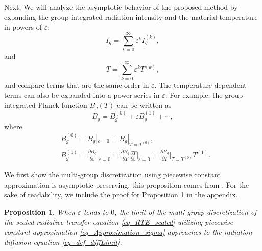 \documentclass[preprint,12pt]{elsarticle}
\theoremstyle{definition}
\theoremstyle{plain}
\newtheorem{proposition}[theorem]{Proposition}
\numberwithin{equation}{section}
\numberwithin{algorithm}{section}
\newcounter{eq_count}
\newcommand{\pdrv}[2]{\frac{\partial{#1}}{\partial{#2}}}
\begin{document}
Next, We will analyze the asymptotic behavior of the proposed method by expanding the group-integrated radiation intensity and the material temperature in powers of $\varepsilon$:
   \begin{equation*}
       I_g = \sum_{k=0}^{\infty} \varepsilon^{k} I_g^{(k)},
   \end{equation*}
   and
   \begin{equation*}
       T = \sum_{k=0}^{\infty} \varepsilon^{k} T^{(k)},
   \end{equation*}
   and compare terms that are the same order in $\varepsilon$.
   The temperature-dependent terms can also be expanded into a power series in $\varepsilon$. For example, the group integrated Planck function $B_g(T)$ can be written as
   \begin{equation*}
       B_g = B_g^{(0)} + \varepsilon B_g^{(1)} + \cdots,
   \end{equation*}
   where 
   \begin{equation*}
       \begin{aligned}
           &B_g^{(0)} = B_g |_{\varepsilon = 0} = B_g|_{T = T^{(0)}},
           \\
           &B_g^{(1)} = \pdrv{B_g}{\varepsilon}\Big|_{\varepsilon = 0} = \pdrv{B_g}{T}\pdrv{T}{\varepsilon}\Big|_{\varepsilon = 0} = \pdrv{B_g}{T}\Big|_{T = T^{(0)}} T^{(1)}.
       \end{aligned}
   \end{equation*}

   We first show the multi-group discretization using piecewise constant approximation is asymptotic preserving, this proposition comes from \cite{ZHANG2023112368}. For the sake of readability, we include the proof for Proposition \ref{eq_prpo1} in the appendix.
   
\begin{proposition} \label{eq_prpo1}
    When $\varepsilon$ tends to $0$, the limit of the  multi-group discretization of the scaled radiative transfer equation \eqref{eq_RTE_scaled} utilizing piecewise constant approximation \eqref{eq_Approximation_sigma} approaches to the radiation diffusion equation \eqref{eq_def_diffLimit}.
\end{proposition}
\end{document}
